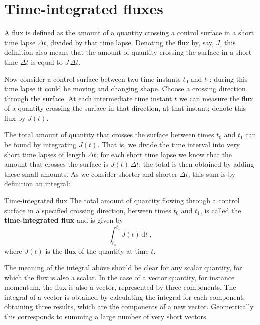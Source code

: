 \documentclass[a4paper,12pt,%
onecolumn,oneside,%
british%
]{memoir}
\newcommand*{\di}{\mathrm{d}}%
\newcommand*{\incr}{\Delta}%
\renewcommand*{\|}[1][]{\nonscript\:#1\vert\nonscript\:\mathopen{}}
\newcommand*{\yti}{t_{0}}
\newcommand*{\ytf}{t_{1}}
\newcommand*{\Dt}{\incr t}
\newcommand*{\yJ}{J}
\begin{document}
%
%


\section{Time-integrated fluxes}
\label{sec:total_flow}

A flux is defined as the amount of a quantity crossing a control surface in a short time lapse $\Dt$, divided by that time lapse. Denoting the flux by, say, $\yJ$, this definition also means that the amount of quantity crossing the surface in a short time $\Dt$ is equal to $\yJ\,\Dt$.

Now consider a control surface between two time instants $\yti$ and $\ytf$; during this time lapse it could be moving and changing shape. Choose a crossing direction through the surface. At each intermediate time instant $t$ we can measure the flux of a quantity crossing the surface in that direction, at that instant; denote this flux by $\yJ(t)$.

The total amount of quantity that crosses the surface between times $\yti$ and $\ytf$ can be found by integrating $\yJ(t)$. That is, we divide the time interval into very short time lapses of length $\Dt$; for each short time lapse we know that the amount that crosses the surface is $\yJ(t)\,\Dt$; the total is then obtained by adding these small amounts. As we consider shorter and shorter $\Dt$, this sum is by definition an integral:
\begin{definition}{Time-integrated flux}
The total amount of quantity flowing through a control surface in a specified crossing direction, between times $\yti$ and $\ytf$, is called the \textbf{time-integrated flux} and is given by
  \begin{equation}
    \label{eq:total_flow_integral}
     \int_{\yti}^{\ytf}\!\! \yJ(t)\,\di t\ ,
   \end{equation}
   where $\yJ(t)$ is the flux of the quantity at time $t$.
\end{definition}

The meaning of the integral above should be clear for any scalar quantity, for which the flux is also a scalar. In the case of a vector quantity, for instance momentum, the flux is also a vector, represented by three components. The integral of a vector is obtained by calculating the integral for each component, obtaining three results, which are the components of a new vector. Geometrically this corresponds to summing a large number of very short vectors.
\end{document}
